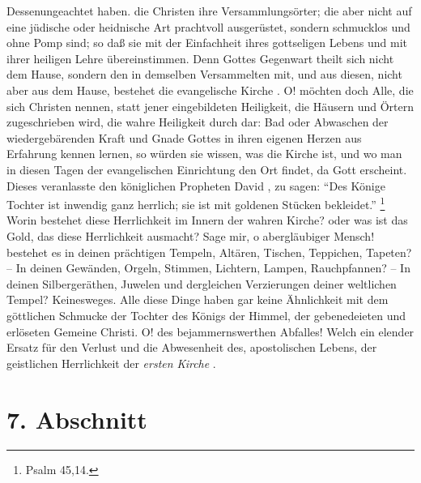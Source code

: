 \medskip

Dessenungeachtet haben. die Christen ihre Versammlungsörter; die aber nicht auf
eine jüdische oder heidnische Art prachtvoll ausgerüstet, sondern schmucklos und
ohne Pomp sind; so daß sie mit der Einfachheit ihres gottseligen Lebens und mit
ihrer heiligen Lehre übereinstimmen. Denn Gottes Gegenwart  theilt sich nicht dem
Hause, sondern den in demselben Versammelten mit, und aus diesen, nicht aber aus
dem Hause, bestehet die evangelische Kirche 
. O! möchten doch Alle, die sich
Christen nennen, statt jener eingebildeten Heiligkeit, die Häusern und Örtern
zugeschrieben wird, die wahre Heiligkeit durch dar: Bad oder Abwaschen der
wiedergebärenden Kraft und Gnade Gottes in ihren eigenen Herzen aus Erfahrung
kennen lernen, so würden sie wissen, was die Kirche ist, und wo man in diesen
Tagen der evangelischen Einrichtung den Ort findet, da Gott erscheint. Dieses
veranlasste den königlichen Propheten David , zu sagen:
"`Des Könige Tochter ist inwendig ganz herrlich; sie ist mit goldenen Stücken
bekleidet."'
\footnote{Psalm 45,14.}
Worin bestehet diese Herrlichkeit im Innern der wahren Kirche? oder was
ist das Gold, das diese Herrlichkeit ausmacht? Sage mir, o abergläubiger Mensch!
bestehet es in deinen prächtigen Tempeln, Altären, Tischen,
Teppichen, Tapeten?
-- In deinen Gewänden, Orgeln, Stimmen, Lichtern, Lampen,
Rauchpfannen? -- In
deinen Silbergeräthen, Juwelen und dergleichen Verzierungen deiner weltlichen
Tempel? Keinesweges. Alle diese Dinge haben gar keine
Ähnlichkeit mit dem
göttlichen Schmucke der Tochter des Königs der Himmel, der gebenedeieten und
erlöseten Gemeine Christi. O! des bejammernswerthen Abfalles! Welch ein elender
Ersatz für den Verlust und die Abwesenheit des, apostolischen Lebens, der
geistlichen Herrlichkeit der \textit{ersten Kirche} .

\section{7. Abschnitt} \label{kap5_ab7}

